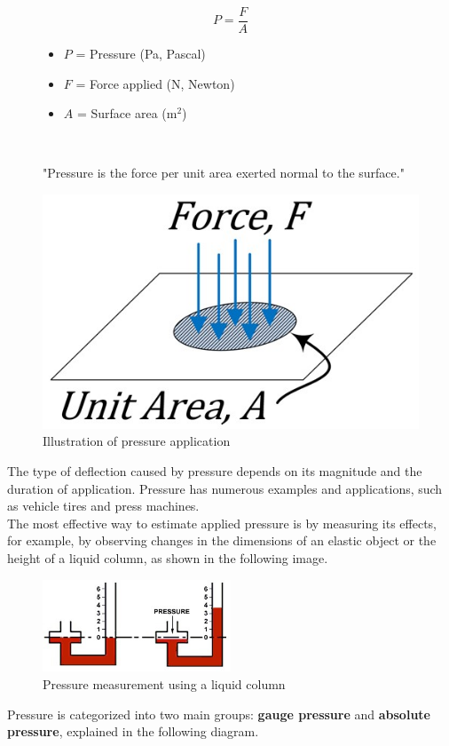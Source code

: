 \documentclass{article}
\newcommand{\wm}[2]{%
	\begin{minipage}{#1\textwidth}
		\centering
		#2
	\end{minipage}%
}
\begin{document}
	\begin{figure}[h]
		\centering
		\begin{minipage}{0.45\textwidth}
			\centering
			\begin{equation}
				P = \frac{F}{A}
				\label{eq:pressure}
			\end{equation}
			\wm{0.7}{
			\begin{itemize}[itemsep=-1mm]
				\item \( P \) = Pressure (Pa, Pascal)
				\item \( F \) = Force applied (N, Newton)
				\item \( A \) = Surface area (m\(^2\))
			\end{itemize}
			}\\[1em]\raggedright
			"Pressure is the force per unit area exerted normal to the surface."
		\end{minipage}
		\hfill
		\begin{minipage}{0.45\textwidth}
			\centering
			\includegraphics[width=\textwidth]{images/Pressure.jpg}
			\caption{Illustration of pressure application}
			\label{fig:pressure}
		\end{minipage}
	\end{figure}
	\noindent
	The type of deflection caused by pressure depends on its magnitude and the duration of application. Pressure has numerous examples and applications, such as vehicle tires and press machines.\\[1em]
	The most effective way to estimate applied pressure is by measuring its effects, for example, by observing changes in the dimensions of an elastic object or the height of a liquid column, as shown in the following image.
	\begin{figure}[H]
		\centering
		\includegraphics[width=0.5\textwidth]{images/Piezometer.jpg}
		\caption{Pressure measurement using a liquid column}
		\label{fig:piezometer}
	\end{figure}
	\noindent
	Pressure is categorized into two main groups: \textbf{gauge pressure} and \textbf{absolute pressure}, explained in the following diagram.
\end{document}
